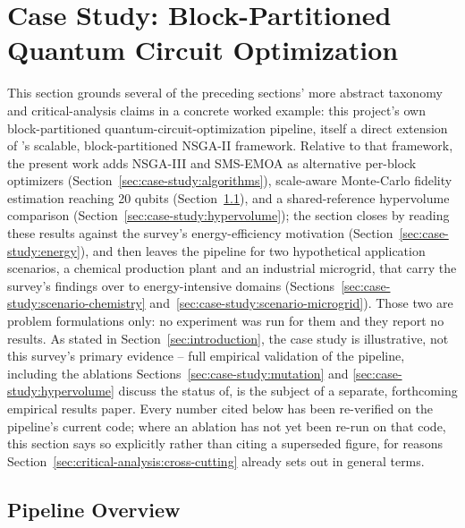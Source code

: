 \section{Case Study: Block-Partitioned Quantum Circuit Optimization}
\label{sec:case-study}

This section grounds several of the preceding sections' more abstract
taxonomy and critical-analysis claims in a concrete worked example: this
project's own block-partitioned quantum-circuit-optimization pipeline,
itself a direct extension of \citet{ghlib2026scalable}'s scalable,
block-partitioned NSGA-II framework. Relative to that framework, the
present work adds NSGA-III and SMS-EMOA as alternative per-block
optimizers (Section~\ref{sec:case-study:algorithms}), scale-aware
Monte-Carlo fidelity estimation reaching 20 qubits
(Section~\ref{sec:case-study:pipeline}), and a shared-reference
hypervolume comparison (Section~\ref{sec:case-study:hypervolume}); the
section closes by reading these results against the survey's
energy-efficiency motivation (Section~\ref{sec:case-study:energy}), and
then leaves the pipeline for two hypothetical application scenarios, a
chemical production plant and an industrial microgrid, that carry the
survey's findings over to energy-intensive domains
(Sections~\ref{sec:case-study:scenario-chemistry}
and~\ref{sec:case-study:scenario-microgrid}). Those two are problem
formulations only: no experiment was run for them and they report no
results. As stated in
Section~\ref{sec:introduction}, the case study is illustrative, not this
survey's primary evidence -- full empirical validation of the pipeline,
including the ablations Sections~\ref{sec:case-study:mutation} and
\ref{sec:case-study:hypervolume} discuss the status of, is the subject
of a separate, forthcoming empirical results paper. Every number cited
below has been re-verified on the pipeline's current code; where an
ablation has not yet been re-run on that code, this section says so
explicitly rather than citing a superseded figure, for reasons
Section~\ref{sec:critical-analysis:cross-cutting} already sets out in
general terms.

\subsection{Pipeline Overview}
\label{sec:case-study:pipeline}

